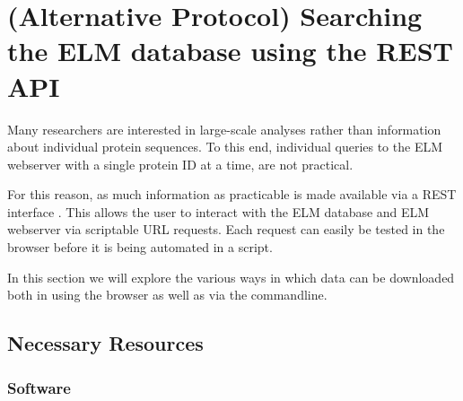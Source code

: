 \documentclass[12pt]{article}
\begin{document}
	\clearpage

	\section{(Alternative Protocol) Searching the ELM database using the REST API}
	\label{sec:search_REST}

	Many researchers are interested in large-scale analyses rather than
	information about individual protein sequences. To this end, individual
	queries to the ELM webserver with a single protein ID at a time, are not
	practical.

	For this reason, as much information as practicable is made available via a
	REST interface \citep{Fielding2002}. This allows the user to interact
	with the ELM database and ELM webserver via scriptable URL requests.
	Each request can easily be tested in the browser before it is being
	automated in a script.

	In this section we will explore the various ways in which data can be
	downloaded both in using the browser as well as via the commandline.

	\subsection*{Necessary Resources}
	\subsubsection*{Software}
	
\end{document}
